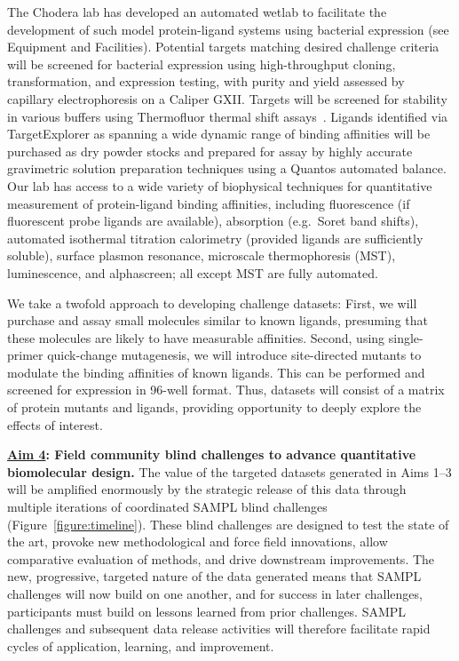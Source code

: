 \documentclass[11pt]{article}
\begin{document}
The Chodera lab has developed an automated wetlab to facilitate the development of such model protein-ligand systems using bacterial expression (see Equipment and Facilities).
Potential targets matching desired challenge criteria will be screened for bacterial expression using high-throughput cloning, transformation, and expression testing, with purity and yield assessed by capillary electrophoresis on a Caliper GXII.
Targets will be screened for stability in various buffers using Thermofluor thermal shift assays~\cite{Reinhard:2013:ActaCrystallographicaSectionFStructuralBiologyandCrystallizationCommunications}.
Ligands identified via TargetExplorer as spanning a wide dynamic range of binding affinities will be purchased as dry powder stocks and prepared for assay by highly accurate gravimetric solution preparation techniques using a Quantos automated balance.
Our lab has access to a wide variety of biophysical techniques for quantitative measurement of protein-ligand binding affinities, including fluorescence (if fluorescent probe ligands are available), absorption (e.g.~Soret band shifts), automated isothermal titration calorimetry (provided ligands are sufficiently soluble), surface plasmon resonance, microscale thermophoresis (MST), luminescence, and alphascreen; all except MST are fully automated. 

We take a twofold approach to developing challenge datasets:
First, we will purchase and assay small molecules similar to known ligands, presuming that these molecules are likely to have measurable affinities.
Second, using single-primer quick-change mutagenesis, we will introduce site-directed mutants to modulate the binding affinities of known ligands.
This can be performed and screened for expression in 96-well format.
Thus, datasets will consist of a matrix of protein mutants and ligands, providing opportunity to deeply explore the effects of interest.


\textbf{\underline{Aim 4}: Field community blind challenges to advance quantitative biomolecular design.}
The value of the targeted datasets generated in Aims 1--3 will be amplified enormously by the strategic release of this data through multiple iterations of coordinated SAMPL blind challenges (Figure~\ref{figure:timeline}).
These blind challenges are designed to test the state of the art, provoke new methodological and force field innovations, allow comparative evaluation of methods, and drive downstream improvements.
The new, progressive, targeted nature of the data generated means that SAMPL challenges will now build on one another, and for success in later challenges, participants must build on lessons learned from prior challenges.
SAMPL challenges and subsequent data release activities will therefore facilitate rapid cycles of application, learning, and improvement.
\end{document}
